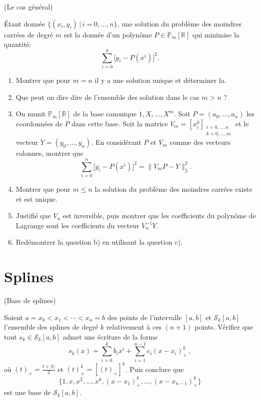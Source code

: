 \documentclass[a4paper,12pt,reqno]{amsart}
\begin{document}
\begin{exo} (Le cas général)

  Étant donnée $\{(x_{i} ,y_{i}) \,|\, i = 0,\ldots,n\}$, une solution du problème des moindres carrées de degré $m$ est la donnée d'un polynôme $P \in \mathbb{P}_{m}[\mathbb{R}]$ qui minimise la quantité:
    $$
        \sum_{i=0}^{n} \big[y_{i} - P(x^{i})\big]^{2}.
    $$

  \begin{enumerate}
    \item Montrer que pour $m=n$ il y a une solution unique et déterminer la.
    \item Que peut on dire dire de l'ensemble des solution dans le cas $m>n$ ?
    \item On munit $\mathbb{P}_{m}[\mathbb{R}]$ de la base canonique $1,X,\ldots,X^{m}$. Soit $P=(a_{0},\ldots,a_{n})$ les coordonnées de $P$ dans cette base. Soit la matrice $V_{m}=\left[x_{i}^{k}\right]_{\substack{i=0,\ldots,n\\ k=0,\ldots,m}}$ et le vecteur $Y=(y_{0},\ldots,y_{n})$. En considérant $P$ et $V_{m}$ comme des vecteurs colonnes, montrer que
      $$
        \sum_{i=0}^{n} \big[y_{i} - P(x^{i})\big]^{2} = \big\| V_{m}P-Y \big\|_{2}^{2}.
      $$
    \item Montrer que pour $m \leq n$ la solution du problème des moindres carrées existe et est unique.
    \item Justifié que $V_{n}$ est inversible, puis montrer que les coefficients du polynôme de Lagrange sont les coefficients du vecteur $V_{n}^{-1}Y$.
    \item Redémontrer la question b) en utilisant la question c).
  \end{enumerate}
\end{exo}


\section{Splines}

\begin{exo} (Base de splines)

  Soient $a=x_0 < x_1 < \cdots < x_{n}=b$ des points de l'intervalle $[a,b]$ et $\mathcal{S}_{k}[a,b]$ l'ensemble des splines de degré $k$ relativement à ces $(n+1)$ points. Vérifier que tout $s_{k} \in \mathcal{S}_{k}[a,b]$ admet une écriture de la forme
  $$
    s_{k}(x) = \sum_{i=0}^{k} b_{i}x^{i} + \sum_{i=1}^{n-1} c_{i}(x - x_{i})_{+}^{k}\,,
  $$
  où $(t)_{+}=\frac{t+|t|}{2}$ et $(t)_{+}^{k}=\left[(t)_{+}\right]^{k}$. Puis conclure que
    $$
      \{1,x,x^{2},\ldots,x^{k},(x-x_{1})_{+}^{k},\ldots,(x-x_{n-1})_{+}^{k}\}
    $$
  est une base de $\mathcal{S}_{k}[a,b]$.
\end{exo}
\end{document}

